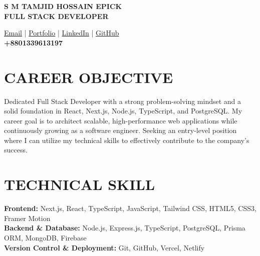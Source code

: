 \documentclass[a4paper,14pt]{extarticle}
\begin{document}
\selectfont

\noindent
\begin{minipage}[t]{0.54\textwidth}
    \textbf{\Large S M TAMJID HOSSAIN EPICK}\\[2pt]
    \textbf{\normalsize FULL STACK DEVELOPER}
\end{minipage}%
\begin{minipage}[t]{0.46\textwidth}
    \raggedleft
    \small %
    \href{mailto:epickhossain970@gmail.com}{Email} | 
    \href{https://epickdev.vercel.app}{Portfolio} | 
    \href{https://www.linkedin.com/in/epick-dev}{LinkedIn} | 
    \href{https://github.com/tamjid97}{GitHub} \\
    \textbf{\normalsize +8801339613197} %
\end{minipage}
\vspace{1.5mm}

\section{CAREER OBJECTIVE}
\small
Dedicated Full Stack Developer with a strong problem-solving mindset and a solid foundation in React, Next.js, Node.js, TypeScript, and PostgreSQL. My career goal is to architect scalable, high-performance web applications while continuously growing as a software engineer. Seeking an entry-level position where I can utilize my technical skills to effectively contribute to the company's success.
\vspace{0.5mm}

\section{TECHNICAL SKILL}
\small
\textbf{Frontend:} Next.js, React, TypeScript, JavaScript, Tailwind CSS, HTML5, CSS3, Framer Motion \\[2mm]
\textbf{Backend \& Database:} Node.js, Express.js, TypeScript, PostgreSQL, Prisma ORM, MongoDB, Firebase \\[2mm]
\textbf{Version Control \& Deployment:} Git, GitHub, Vercel, Netlify
\vspace{0.5mm}

\end{document}
